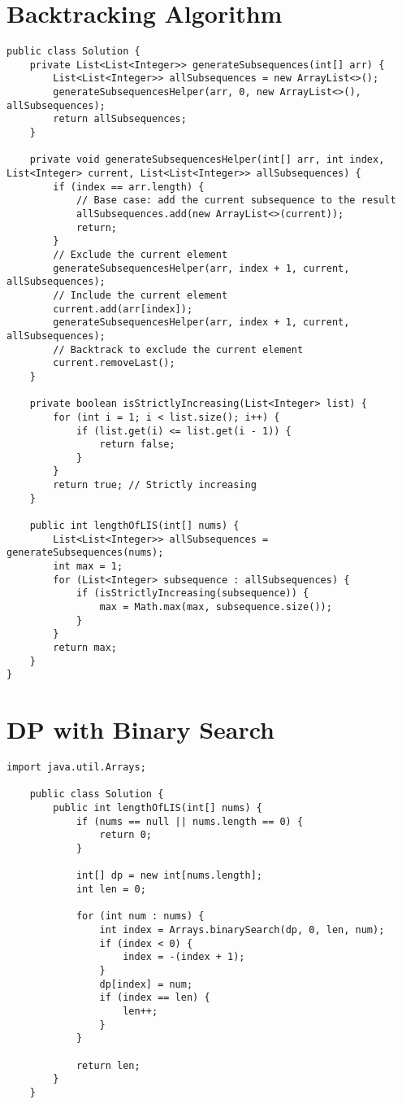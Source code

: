 \documentclass{article}
\begin{document}
    \section{Backtracking Algorithm}
    \begin{lstlisting}[caption=$\mathcal{O}(2^{n})$ Backtracking Algorithm]
public class Solution {
	private List<List<Integer>> generateSubsequences(int[] arr) {
		List<List<Integer>> allSubsequences = new ArrayList<>();
		generateSubsequencesHelper(arr, 0, new ArrayList<>(), allSubsequences);
		return allSubsequences;
	}
	
	private void generateSubsequencesHelper(int[] arr, int index, List<Integer> current, List<List<Integer>> allSubsequences) {
		if (index == arr.length) {
			// Base case: add the current subsequence to the result
			allSubsequences.add(new ArrayList<>(current));
			return;
		}		
		// Exclude the current element
		generateSubsequencesHelper(arr, index + 1, current, allSubsequences);		
		// Include the current element
		current.add(arr[index]);
		generateSubsequencesHelper(arr, index + 1, current, allSubsequences);		
		// Backtrack to exclude the current element
		current.removeLast();
	}
	
	private boolean isStrictlyIncreasing(List<Integer> list) {
		for (int i = 1; i < list.size(); i++) {
			if (list.get(i) <= list.get(i - 1)) {
				return false;
			}
		}
		return true; // Strictly increasing
	}
	
    public int lengthOfLIS(int[] nums) {
    	List<List<Integer>> allSubsequences = generateSubsequences(nums);
    	int max = 1;
    	for (List<Integer> subsequence : allSubsequences) {
    		if (isStrictlyIncreasing(subsequence)) {
    			max = Math.max(max, subsequence.size());
    		}
    	}
    	return max;
    }
}
    \end{lstlisting}

    \section{DP with Binary Search}
    \begin{lstlisting}[caption=$\mathcal{O}(n\log_{}{n})$ DP with Binary Search]
	import java.util.Arrays;

	public class Solution {
		public int lengthOfLIS(int[] nums) {
			if (nums == null || nums.length == 0) {
				return 0;
			}

			int[] dp = new int[nums.length];
			int len = 0;

			for (int num : nums) {
				int index = Arrays.binarySearch(dp, 0, len, num);
				if (index < 0) {
					index = -(index + 1);
				}
				dp[index] = num;
				if (index == len) {
					len++;
				}
			}

			return len;
		}
	}
    \end{lstlisting}
\end{document}
